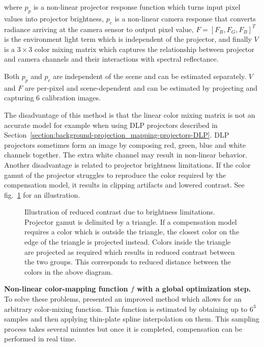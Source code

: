 where \(p_p\) is a non-linear projector response function which turns input pixel values into projector brightness, \(p_c\) is a non-linear camera response that converts radiance arriving at the camera sensor to output pixel value, \(F = [F_R, F_G, F_B]^T\) is the environment light term which is independent of the projector, and finally \(V\) is a \(3 \times 3\) color mixing matrix which captures the relationship between projector and camera channels and their interactions with spectral reflectance.

Both \(p_p\) and \(p_c\) are independent of the scene and can be estimated separately. \(V\) and \(F\) are per-pixel and scene-dependent and can be estimated by projecting and capturing 6 calibration images.

The disadvantage of this method is that the linear color mixing matrix is not an accurate model for example when using DLP projectors described in Section~\ref{section:background-projection_mapping-projectors-DLP}. DLP projectors sometimes form an image by composing red, green, blue and white channels together. The extra white channel may result in non-linear behavior. Another disadvantage is related to projector brightness limitations. If the color gamut of the projector struggles to reproduce the color required by the compensation model, it results in clipping artifacts and lowered contrast. See fig.~\ref{fig:background_clipping} for an illustration.

\begin{figure}[ht]
    \centering
    \def\svgwidth{0.4\textwidth}
    
    \caption{Illustration of reduced contrast due to brightness limitations. Projector gamut is delimited by a triangle. If a compensation model requires a color which is outside the triangle, the closest color on the edge of the triangle is projected instead. Colors inside the triangle are projected as required which results in reduced contrast between the two groups. This corresponds to reduced distance between the colors in the above diagram.}
    \label{fig:background_clipping}
\end{figure}

\textbf{Non-linear color-mapping function \(f\) with a global optimization step.} To solve these problems, \citet{Grundhofer2015} presented an improved method which allows for an arbitrary color-mixing function. This function is estimated by obtaining up to \(6^3\) samples and then applying thin-plate spline interpolation on them. This sampling process takes several minutes but once it is completed, compensation can be performed in real time.

